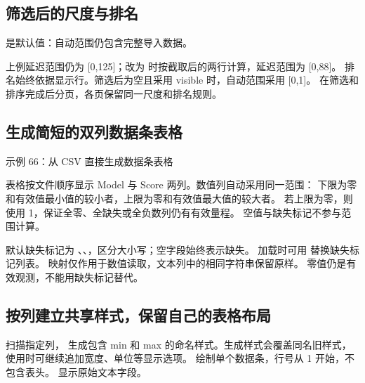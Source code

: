\subsection{筛选后的尺度与排名}
 是默认值：自动范围仍包含完整导入数据。

上例延迟范围仍为 [0,125]；改为  时按截取后的两行计算，延迟范围为 [0,88]。
排名始终依据显示行。筛选后为空且采用 visible 时，自动范围采用 [0,1]。
 在筛选和排序完成后分页，各页保留同一尺度和排名规则。

\subsection{生成简短的双列数据条表格}
\begin{example}[text and listing,sidebyside=false]{示例 66：从 CSV 直接生成数据条表格}
\begin{center}
\end{center}
\end{example}

表格按文件顺序显示 Model 与 Score 两列。数值列自动采用同一范围：
下限为零和有效值最小值的较小者，上限为零和有效值最大值的较大者。
若上限为零，则使用 1，保证全零、全缺失或全负数列仍有有效量程。
空值与缺失标记不参与范围计算。

默认缺失标记为 、、，区分大小写；空字段始终表示缺失。
加载时可用  替换缺失标记列表。
映射仅作用于数值读取，文本列中的相同字符串保留原样。
零值仍是有效观测，不能用缺失标记替代。


\clearpage
\subsection{按列建立共享样式，保留自己的表格布局}
 扫描指定列，
生成包含 min 和 max 的命名样式。生成样式会覆盖同名旧样式，
使用时可继续追加宽度、单位等显示选项。
 绘制单个数据条，行号从 1 开始，不包含表头。
 显示原始文本字段。

